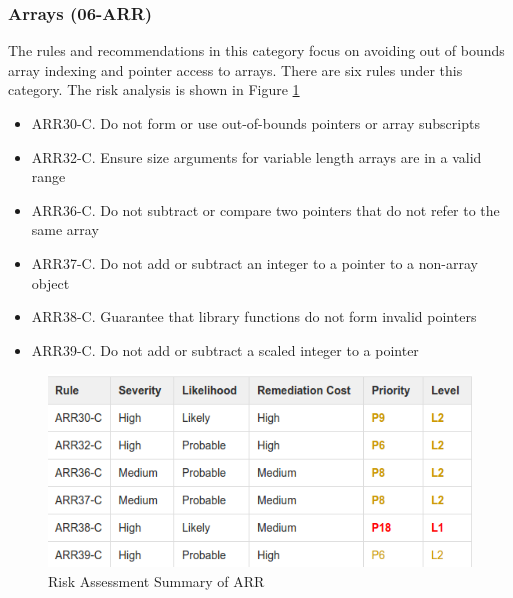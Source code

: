 \subsubsection{Arrays (06-ARR)} The rules and recommendations in this category focus on avoiding out of bounds array indexing and pointer access to arrays. There are six rules under this category. The risk analysis is shown in Figure \ref{fig:7}\cite{cert-c}
\begin{itemize}
	\item ARR30-C. Do not form or use out-of-bounds pointers or array subscripts
	
	\item ARR32-C. Ensure size arguments for variable length arrays are in a valid range
	
	\item ARR36-C. Do not subtract or compare two pointers that do not refer to the same array
	
	\item ARR37-C. Do not add or subtract an integer to a pointer to a non-array object
	
	\item ARR38-C. Guarantee that library functions do not form invalid pointers
	
	\item ARR39-C. Do not add or subtract a scaled integer to a pointer
\end{itemize}
\begin{figure}[H]
	
	
	\centering
	\includegraphics[width=.6\linewidth]{Figures/arr}
	\caption{Risk Assessment Summary of ARR}
	\label{fig:7}
	
\end{figure}
